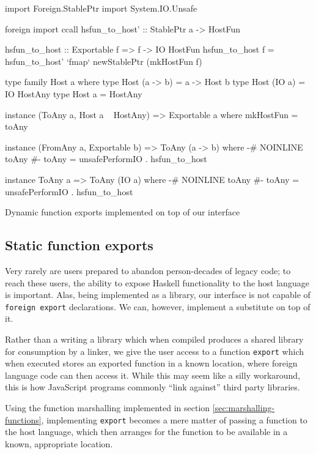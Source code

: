 \documentclass[preprint]{sigplanconf}
\begin{document}
\begin{listingfloat}
\begin{code}
  import Foreign.StablePtr
  import System.IO.Unsafe

  foreign import ccall
    hsfun_to_host' :: StablePtr a -> HostFun

  hsfun_to_host :: Exportable f => f -> IO HostFun
  hsfun_to_host f =
    hsfun_to_host' `fmap` newStablePtr (mkHostFun f)

  type family Host a where
    type Host (a -> b) = a -> Host b
    type Host (IO a)   = IO HostAny
    type Host a        = HostAny

  instance (ToAny a, Host a ~ HostAny) =>
            Exportable a where
    mkHostFun = toAny

  instance (FromAny a, Exportable b) =>
            ToAny (a -> b) where
    {-# NOINLINE toAny #-}
    toAny = unsafePerformIO . hsfun_to_host

  instance ToAny a => ToAny (IO a) where
    {-# NOINLINE toAny #-}
    toAny = unsafePerformIO . hsfun_to_host
\end{code}
\caption{Dynamic function exports implemented on top of our interface}
\label{lst:export-final}
\end{listingfloat}

\subsection{Static function exports}
\label{sec:exports}
Very rarely are users prepared to abandon person-decades of legacy code;
to reach these users, the ability to expose Haskell functionality to the host
language is important. Alas, being implemented as a library, our interface is
not capable of \lstinline!foreign export! declarations. We can, however,
implement a substitute on top of it.

Rather than a writing a library which when compiled produces a shared library
for consumption by a linker, we give the user access to a function
\lstinline!export! which when executed stores an exported function in a
known location, where foreign language code can then access it.
While this may seem like a silly workaround, this is how JavaScript programs
commonly ``link against'' third party libraries.

Using the function marshalling implemented in section
\ref{sec:marshalling-functions}, implementing \lstinline!export! becomes a
mere matter of passing a function to the host language, which then
arranges for the function to be available in a known, appropriate location.
\end{document}
